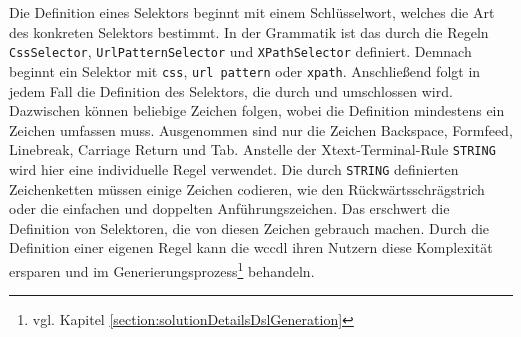     Die Definition eines Selektors beginnt mit einem Schlüsselwort,
    welches die Art des konkreten Selektors bestimmt.
    In der Grammatik ist das durch die Regeln
    \texttt{CssSelector}, \texttt{UrlPatternSelector} und \texttt{XPathSelector} definiert.
    Demnach beginnt ein Selektor mit \texttt{css}, \texttt{url pattern} oder \texttt{xpath}.
    Anschließend folgt in jedem Fall die Definition des Selektors,
    die durch {\flqq } und {\frqq } umschlossen wird.
    Dazwischen können beliebige Zeichen folgen, wobei die Definition mindestens ein Zeichen umfassen muss.
    Ausgenommen sind nur die Zeichen Backspace, Formfeed, Linebreak, Carriage Return und Tab.
    Anstelle der Xtext-Terminal-Rule \texttt{STRING} wird hier eine individuelle Regel verwendet.
    Die durch \texttt{STRING} definierten Zeichenketten müssen einige Zeichen codieren,
    wie den Rückwärtsschrägstrich oder die einfachen und doppelten Anführungszeichen.
    Das erschwert die Definition von Selektoren, die von diesen Zeichen gebrauch machen.
    Durch die Definition einer eigenen Regel kann die \gls{wccdl} ihren Nutzern diese Komplexität
    ersparen und im Generierungsprozess\footnote{vgl. Kapitel \ref{section:solutionDetailsDslGeneration}} behandeln.
